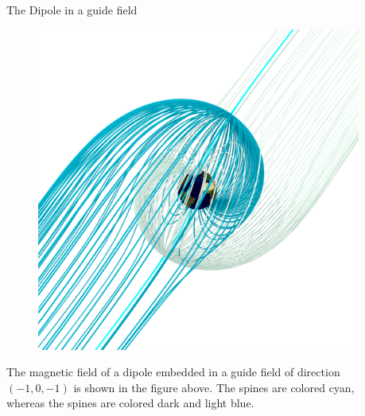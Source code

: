 \documentclass[final]{beamer}
\newlength{\onecolwid}
\newlength{\twocolwid}
\begin{document}
\begin{frame}[t]
\begin{columns}[t]
\begin{column}{\twocolwid}
\begin{columns}[t,totalwidth=\twocolwid]
\begin{column}{\onecolwid}

\end{column} %

\begin{column}{\onecolwid} %

\begin{block}{The Dipole in a guide field}
    \begin{figure}
    \includegraphics[width=\onecolwid]{fig/separatrix_dipole.png}
    \end{figure}

    The magnetic field of a dipole embedded in a guide field of direction $(-1,0,-1)$ is
    shown in the figure above. 
    The spines are colored cyan, whereas the spines are colored dark and light blue. 


\end{block}



\end{column}
\end{columns}
\end{column}
\end{columns}
\end{frame}
\end{document}
